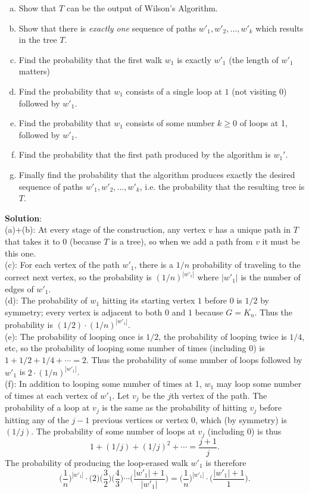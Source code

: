 \documentclass{amsart}
\begin{document}
	\begin{enumerate}[(a)]
		\item Show that $T$ can be the output of Wilson's Algorithm.
		\item Show that there is \textit{exactly one} sequence of paths $w'_1,w'_2,\dots,w'_k$ which results in the tree $T$.
		\item Find the probability that the first walk $w_1$ is exactly $w'_1$ (the length of $w'_1$ matters)
		\item Find the probability that $w_1$ consists of a single loop at $1$ (not visiting $0$) followed by $w'_1$. 
		\item Find the probability that $w_1$ consists of some number $k\geq 0$ of loops at 1, followed by $w'_1$.
		\item Find the probability that the first path produced by the algorithm is $w_1'$.
		\item Finally find the probability that the algorithm produces exactly the desired sequence of paths $w'_1,w'_2,\dots,w'_k$, i.e. the probability that the resulting tree is $T$.\\
	\end{enumerate}
	
	
	\textbf{Solution}: \\
	
	(a)+(b): At every stage of the construction, any vertex $v$ has a unique path in $T$ that takes it to 0 (because $T$ is a tree), so when we add a path from $v$ it must be this one.\\
	
	(c): For each vertex of the path $w'_1$, there is a $1/n$ probability of traveling to the correct next vertex, so the probability is $(1/n)^{|w'_1|}$ where $|w'_1|$ is the number of edges of $w'_1$.\\
	
	(d): The probability of $w_1$ hitting its starting vertex $1$ before $0$ is $1/2$ by symmetry; every vertex is adjacent to both $0$ and $1$ because $G=K_n$. Thus the probability is $(1/2)\cdot (1/n)^{|w'_1|}$.\\
	
	(e): The probability of looping once is $1/2$, the probability of looping twice is $1/4$, etc, so the probability of looping some number of times (including 0) is $1 + 1/2+1/4+\cdots = 2$. Thus the probability of some number of loops followed by $w'_1$ is $2\cdot (1/n)^{|w'_1|}$.\\
	
	(f): In addition to looping some number of times at 1, $w_1$ may loop some number of times at each vertex of $w'_1$. Let $v_j$ be the $j$th vertex of the path. The probability of a loop at $v_j$ is the same as the probability of hitting $v_j$ before hitting any of the $j-1$ previous vertices or vertex 0, which (by symmetry) is $(1/j)$. The probability of some number of loops at $v_j$ (including 0) is thus 
	$$1 + (1/j) + (1/j)^2 + \cdots = \frac{j+1}{j}.$$
	The probability of producing the loop-erased walk $w'_1$ is therefore 
	$$
	\Big(\frac{1}{n}\Big)^{|w'_1|} \cdot \big(2\big) \bigg(\frac{3}{2} \bigg)\bigg( \frac{4}{3}\bigg)\cdots \bigg(\frac{|w'_1| + 1}{|w'_1|}\bigg) = \Big(\frac{1}{n}\Big)^{|w'_1|} \cdot \bigg(\frac{|w'_1|+1}{1}\bigg).
	$$
	
\end{document}
